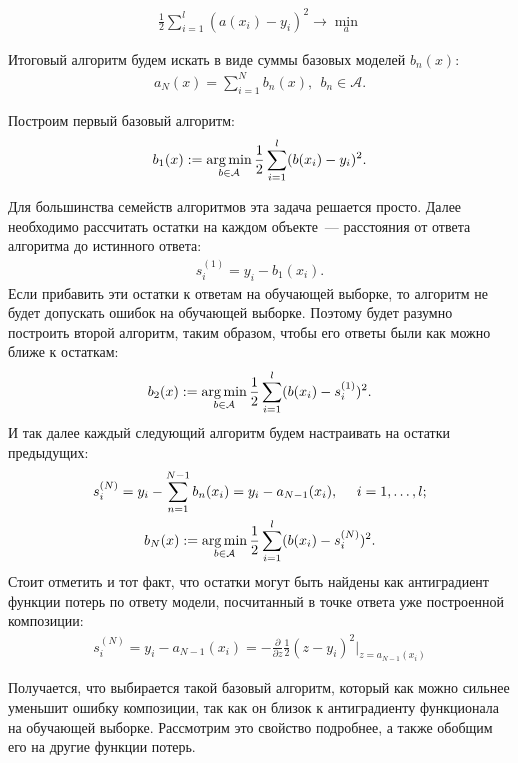 \documentclass[12pt,a4paper]{article} %
\begin{document}
 \begin{gather}\label{bust1}
	\frac{1}{2}\sum\limits_{i=1}^{l}(a(x_i)-y_i)^2 \rightarrow \min_a
\end{gather}

Итоговый алгоритм будем искать в виде суммы базовых моделей $b_n(x)$:
\begin{gather}\label{bust2}
	a_N(x) = \sum\limits_{i=1}^{N}b_n(x),~~b_n\in \mathcal{A}.
\end{gather}

Построим первый базовый алгоритм:
\begin{gather}\label{bust3}
	b_1(x): = \mathop{\rm arg\,min}\limits_{b\in\mathcal{A}}\frac{1}{2}\sum\limits_{i=1}^{l}(b(x_i)-y_i)^2.
\end{gather}

Для большинства семейств алгоритмов эта задача решается просто. Далее необходимо рассчитать остатки на каждом объекте~--- расстояния от ответа алгоритма до истинного ответа:
\begin{gather}\label{bust4}
	s_i^{(1)} = y_i - b_1(x_i).
\end{gather}
Если прибавить эти остатки к ответам на обучающей выборке, то алгоритм не будет допускать ошибок на обучающей выборке. Поэтому будет разумно построить второй алгоритм, таким образом, чтобы его ответы были как можно ближе к остаткам:
\begin{gather}\label{bust5}
	b_2(x): = \mathop{\rm arg\,min}\limits_{b\in\mathcal{A}}\frac{1}{2}\sum\limits_{i=1}^{l}(b(x_i)-s_i^{(1)})^2.
\end{gather}
И так далее каждый следующий алгоритм будем настраивать на остатки предыдущих:
\begin{gather}\label{bust6}
	s_i^{(N)} = y_i - \sum\limits_{n=1}^{N-1}b_n(x_i) = y_i - a_{N-1}(x_i),~~~~i=1,\dots,l;
	\\
	b_N(x): = \mathop{\rm arg\,min}\limits_{b\in\mathcal{A}}\frac{1}{2}\sum\limits_{i=1}^{l}(b(x_i)-s_i^{(N)})^2.
\end{gather}
Стоит отметить и тот факт, что остатки могут быть найдены как антиградиент функции потерь по ответу модели, посчитанный в точке ответа уже построенной композиции:
\begin{gather}\label{bust7}
	s_i^{(N)} = y_i - a_{N-1}(x_i) = - \frac{\partial }{\partial z}\frac{1}{2}(z-y_i)^2\bigg|_{z=a_{N-1}(x_i)}
\end{gather}

Получается, что выбирается такой базовый алгоритм, который как можно сильнее уменьшит ошибку композиции, так как он близок к антиградиенту функционала на обучающей выборке. Рассмотрим это свойство подробнее, а также обобщим его на другие функции потерь.
\end{document}
